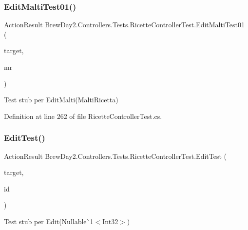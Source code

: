 \subsubsection{\texorpdfstring{Edit\+Malti\+Test01()}{EditMaltiTest01()}}
{\footnotesize\ttfamily Action\+Result Brew\+Day2.\+Controllers.\+Tests.\+Ricette\+Controller\+Test.\+Edit\+Malti\+Test01 (\begin{DoxyParamCaption}\item[{\mbox{[}\+Pex\+Assume\+Under\+Test\mbox{]} \mbox{\hyperlink{class_brew_day2_1_1_controllers_1_1_ricette_controller}{Ricette\+Controller}}}]{target,  }\item[{\mbox{\hyperlink{class_brew_day2_1_1_models_1_1_malti_ricetta}{Malti\+Ricetta}}}]{mr }\end{DoxyParamCaption})}



Test stub per Edit\+Malti(\+Malti\+Ricetta)



Definition at line 262 of file Ricette\+Controller\+Test.\+cs.

\mbox{\label{class_brew_day2_1_1_controllers_1_1_tests_1_1_ricette_controller_test_acc12e51a1c1314393c980d9c642941b9}} 
\subsubsection{\texorpdfstring{Edit\+Test()}{EditTest()}}
{\footnotesize\ttfamily Action\+Result Brew\+Day2.\+Controllers.\+Tests.\+Ricette\+Controller\+Test.\+Edit\+Test (\begin{DoxyParamCaption}\item[{\mbox{[}\+Pex\+Assume\+Under\+Test\mbox{]} \mbox{\hyperlink{class_brew_day2_1_1_controllers_1_1_ricette_controller}{Ricette\+Controller}}}]{target,  }\item[{int?}]{id }\end{DoxyParamCaption})}



Test stub per Edit(Nullable\`{}1$<$Int32$>$)




